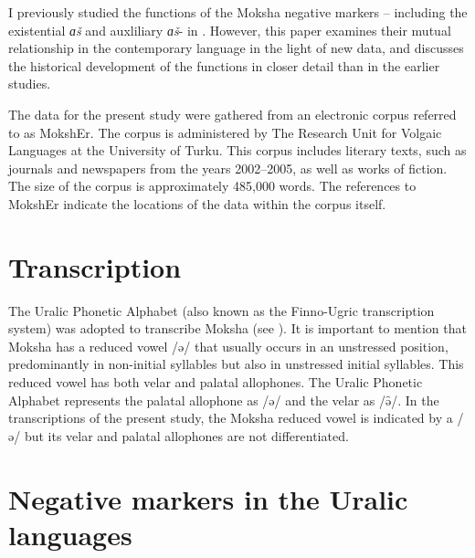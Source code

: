 \documentclass[output=paper]{langsci/langscibook}
\begin{document}
I previously studied the functions of the Moksha negative markers --
including the existential \textit{ɑš} and auxliliary \textit{ɑš}- in \textcites{Hamari2007}{Hamari2013}. However, this paper examines their mutual relationship in the contemporary language in the light of new data, and discusses the historical development of the functions in closer detail than in the earlier studies.

  The data for the present study were gathered from an electronic corpus referred to as MokshEr. The corpus is administered by The Research Unit for Volgaic Languages at the University of Turku. This corpus includes literary texts, such as journals and newspapers from the years 2002--2005, as well as works of fiction. The size of the corpus is approximately 485,000 words. The references to MokshEr indicate the locations of the data within the corpus itself.

\section{Transcription}\label{sec:2:2}

The Uralic Phonetic Alphabet (also known as the Finno-Ugric transcription system) was adopted to transcribe Moksha (see \citealt{SovijarviPeltola1977}). It is important to mention that Moksha has a reduced vowel /ə/ that usually occurs in an unstressed position, predominantly in non-initial syllables but also in unstressed initial syllables. This reduced vowel has both velar and palatal allophones. The Uralic Phonetic Alphabet represents the palatal allophone as /ə/ and the velar as /ǝ̑/. In the transcriptions of the present study, the Moksha reduced vowel is indicated by a /ə/ but its velar and palatal allophones are not differentiated.

\section{Negative markers in the Uralic languages}\label{sec:2:3}
\end{document}
